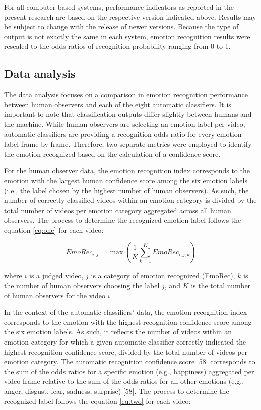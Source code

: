 \documentclass[10pt,letterpaper]{article}
\begin{document}
For all computer-based systems, performance indicators as reported in the present research are based on the respective version indicated above. Results may be subject to change with the release of newer versions. Because the type of output is not exactly the same in each system, emotion recognition results were rescaled to the odds ratios of recognition probability ranging from 0 to 1.

\hypertarget{data-analysis}{%
\subsection*{Data analysis}\label{data-analysis}}

The data analysis focuses on a comparison in emotion recognition performance between human observers and each of the eight automatic classifiers. It is important to note that classification outputs differ slightly between humans and the machine. While human observers are selecting an emotion label per video, automatic classifiers are providing a recognition odds ratio for every emotion label frame by frame. Therefore, two separate metrics were employed to identify the emotion recognized based on the calculation of a confidence score.

For the human observer data, the emotion recognition index corresponds to the emotion with the largest human confidence score among the six emotion labels (i.e., the label chosen by the highest number of human observers). As such, the number of correctly classified videos within an emotion category is divided by the total number of videos per emotion category aggregated across all human observers. The process to determine the recognized emotion label follows the equation \eqref{eq:one} for each video:

\begin{equation}
{EmoRec_{i,j}} = \max\left(\frac{1}{K}\sum_{k=1}^{K}EmoRec_{i,j,k}\right)\label{eq:one}
\end{equation}

where \(i\) is a judged video, \(j\) is a category of emotion recognized (EmoRec), \(k\) is the number of human observers choosing the label \(j\), and \(K\) is the total number of human observers for the video \(i\).

In the context of the automatic classifiers' data, the emotion recognition index corresponds to the emotion with the highest recognition confidence score among the six emotion labels. As such, it reflects the number of videos within an emotion category for which a given automatic classifier correctly indicated the highest recognition confidence score, divided by the total number of videos per emotion category. The automatic recognition confidence score {[}58{]} corresponds to the sum of the odds ratios for a specific emotion (e.g., happiness) aggregated per video-frame relative to the sum of the odds ratios for all other emotions (e.g., anger, disgust, fear, sadness, surprise) {[}58{]}. The process to determine the recognized label follows the equation \eqref{eq:two} for each video:
\end{document}
